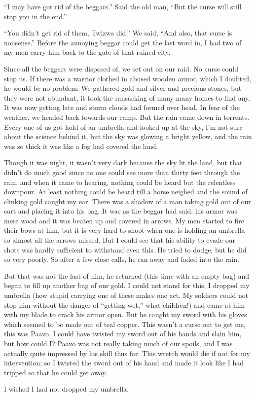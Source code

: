 ``I may have got rid of the beggars.'' Said the old man, ``But the curse will still stop you in the end.''

``You didn't get rid of them, Twizwa did.'' We said, ``And also, that curse is nonsense.'' 
Before the annoying beggar could get the last word in, I had two of my men carry him back to the gate of that ruined city.

Since all the beggars were disposed of, we set out on our raid. No curse could stop us. If there was a warrior clothed in abused wooden armor, which I doubted, he would be no problem. We gathered gold and silver and precious stones, but they were not abundant, it took the ransacking of many many homes to find any. It was now getting late and storm clouds had formed over head. In fear of the weather, we headed back towards our camp. But the rain came down in torrents. Every one of us got hold of an umbrella and looked up at the sky, I'm not sure about the science behind it, but the sky was glowing a bright yellow, and the rain was so thick it was like a fog had covered the land.

Though it was night, it wasn't very dark because the sky lit the land, but that didn't do much good since no one could see more than thirty feet through the rain, and when it came to hearing, nothing could be heard but the relentless downpour. At least nothing could be heard till a horse neighed and the sound of clinking gold caught my ear. There was a shadow of a man taking gold out of our cart and placing it into his bag. It was as the beggar had said, his armor was mere wood and it was beaten up and covered in arrows. My men started to fire their bows at him, but it is very hard to shoot when one is holding an umbrella so almost all the arrows missed. But I could see that his ability to evade our shots was hardly sufficient to withstand even this. He tried to dodge, but he did so very poorly. So after a few close calls, he ran away and faded into the rain.

But that was not the last of him, he returned (this time with an empty bag) and began to fill up another bag of our gold. I could not stand for this, I dropped my umbrella (how stupid carrying one of these makes one act. My soldiers could not stop him without the danger of ``getting wet,'' what children!) and came at him with my blade to crack his armor open. But he caught my sword with his gloves which seemed to be made out of teal copper. This wasn't a curse out to get me, this was Paavo. I could have twisted my sword out of his hands and slain him, but how could I? Paavo was not really taking much of our spoils, and I was actually quite impressed by his skill thus far. This wretch would die if not for my intervention; so I twisted the sword out of his hand and made it look like I had tripped so that he could get away.

I wished I had not dropped my umbrella.
